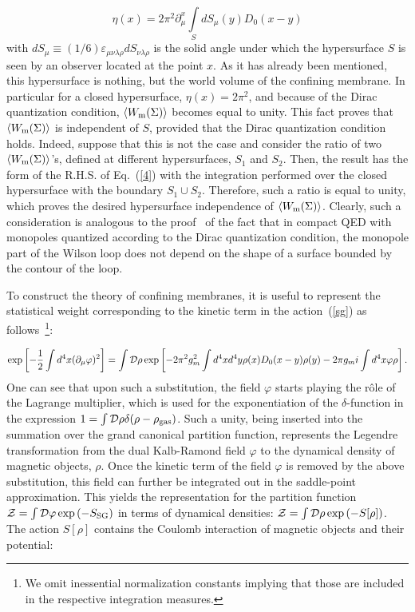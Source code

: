 \documentclass[a4paper,12pt]{article}
\begin{document}
\begin{equation}
\label{solid}
\eta(x)=2\pi^2\partial_\mu^x\int
\limits_{S}^{} dS_\mu(y)D_0(x-y)
\end{equation}
with $dS_\mu\equiv(1/6)\varepsilon_{\mu\nu\lambda\rho}dS_{\nu\lambda\rho}$ is the solid
angle under which the hypersurface $S$ is seen by an observer located at the point $x$. As it has already been mentioned, 
this hypersurface is nothing, but the world volume of the confining membrane.
In particular for a closed hypersurface, $\eta(x)=2\pi^2$, and because of the Dirac quantization condition, 
$\left<W_{\rm m}(\Sigma)\right>$ becomes equal to unity. This fact proves that $\left<W_{\rm m}(\Sigma)\right>$
is independent of $S$, provided that the Dirac quantization condition holds.
Indeed, suppose that this is not the case and consider the ratio of two  $\left<W_{\rm m}(\Sigma)\right>$'s,
defined at different hypersurfaces, $S_1$ and $S_2$. Then, the result has the form of the R.H.S. of Eq.~(\ref{4}) with the 
integration performed over the closed hypersurface with the boundary $S_1\cup S_2$.
Therefore, such a ratio is equal to unity, which proves the desired hypersurface independence of  
$\left<W_{\rm m}(\Sigma)\right>$.
Clearly, such a consideration is analogous to the proof~\cite{4} of the fact that in compact QED with monopoles
quantized according to the Dirac quantization condition,
the monopole part of the Wilson loop does not depend on the shape of a surface bounded by the 
contour of the loop.

To construct the theory of confining membranes, it is useful to represent
the statistical weight corresponding to the kinetic term in the action~(\ref{sg}) as follows~\footnote{
We omit inessential normalization constants implying that those are included in the respective
integration measures.}:

$$\exp\left[-\frac12\int d^4x(\partial_\mu\varphi)^2\right]=
\int {\cal D}\rho\exp\left[-2\pi^2g_m^2\int d^4xd^4y\rho(x)D_0(x-y)\rho(y)
-2\pi g_m i\int d^4x\varphi\rho\right].$$
One can see that upon such a substitution, the field $\varphi$ starts playing the r\^ole of the 
Lagrange multiplier, which is used for the exponentiation of the $\delta$-function in the 
expression $1=\int {\cal D}\rho\delta(\rho-\rho_{\rm gas})$. Such a unity, being inserted into the 
summation over the grand canonical partition function, represents the Legendre transformation from 
the dual Kalb-Ramond field $\varphi$ to the dynamical density of magnetic objects, $\rho$.
Once the kinetic term of the field $\varphi$ is removed by the above substitution, this field
can further be integrated out in the saddle-point approximation. This yields the 
representation for the partition function ${\cal Z}=\int {\cal D}\varphi\exp\left(-S_{\rm SG}\right)$
in terms of dynamical densities: ${\cal Z}=\int {\cal D}\rho\exp\left(-S[\rho]\right)$.
The action $S[\rho]$ contains the Coulomb interaction of magnetic objects and their potential:
\end{document}
